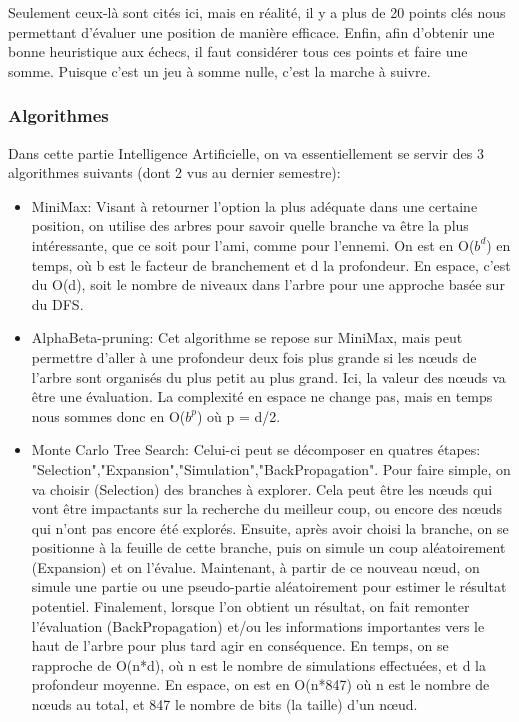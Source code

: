 \documentclass{article}
\begin{document}
Seulement ceux-là sont cités ici, mais en réalité, il y a plus de 20 points clés nous permettant d'évaluer une position de manière efficace.
Enfin, afin d'obtenir une bonne heuristique aux échecs, il faut considérer tous ces points et faire une somme. Puisque c'est un jeu à somme nulle,
c'est la marche à suivre. 

\subsubsection{Algorithmes}
Dans cette partie Intelligence Artificielle, on va essentiellement se servir des 3 algorithmes suivants (dont 2 vus au dernier semestre):
\begin{itemize}
    \item MiniMax: Visant à retourner l'option la plus adéquate dans une certaine position, on utilise des arbres pour savoir quelle branche va être la
    plus intéressante, que ce soit pour l'ami, comme pour l'ennemi. On est en O($b^d$) en temps, où b est le facteur de branchement et d la profondeur.
    En espace, c'est du O(d), soit le nombre de niveaux dans l'arbre pour une approche basée sur du DFS.
    \item AlphaBeta-pruning: Cet algorithme se repose sur MiniMax, mais peut permettre d'aller à une profondeur deux fois plus grande si les nœuds de
    l'arbre sont organisés du plus petit au plus grand. Ici, la valeur des nœuds va être une évaluation. La complexité en espace ne change pas, mais
    en temps nous sommes donc en O($b^p$) où p = d/2.
    \item Monte Carlo Tree Search: Celui-ci peut se décomposer en quatres étapes: "Selection","Expansion","Simulation","BackPropagation". Pour faire simple,
    on va choisir (Selection) des branches à explorer. Cela peut être les nœuds qui vont être impactants sur la recherche du meilleur coup,
    ou encore des nœuds qui n'ont pas encore été explorés. Ensuite, après avoir choisi la branche, on se positionne à la feuille de cette branche,
    puis on simule un coup aléatoirement (Expansion) et on l'évalue. Maintenant, à partir de ce nouveau nœud, on simule une partie ou une pseudo-partie
    aléatoirement pour estimer le résultat potentiel. Finalement, lorsque l'on obtient un résultat, on fait remonter l'évaluation (BackPropagation)
    et/ou les informations importantes vers le haut de l'arbre pour plus tard agir en conséquence. En temps, on se rapproche de O(n*d), où n est le
    nombre de simulations effectuées, et d la profondeur moyenne. En espace, on est en O(n*847) où n est le nombre de nœuds au total, et 847 le
    nombre de bits (la taille) d'un nœud.
\end{itemize}
\end{document}

